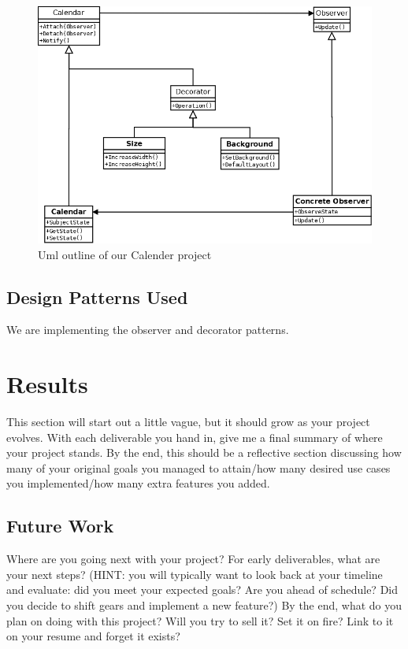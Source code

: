 \documentclass[10pt,conference,onecolumn,compsoc]{IEEEtran}
\begin{document}
\begin{figure}[ht!]
\includegraphics[scale=1]{Uml Format.png}
\caption{Uml outline of our Calender project}
\label{UML of Calender Project}
\end{figure}


\subsection{Design Patterns Used}
We are implementing the observer and decorator patterns.


\section{Results}
This section will start out a little vague, but it should grow as your project evolves.  With each deliverable you hand in, give me a final summary of where your project stands.  By the end, this should be a reflective section discussing how many of your original goals you managed to attain/how many desired use cases you implemented/how many extra features you added.

\subsection{Future Work}
Where are you going next with your project?
For early deliverables, what are your next steps?  (HINT: you will typically want to look back at your timeline and evaluate: did you meet your expected goals?  Are you ahead of schedule?  Did you decide to shift gears and implement a new feature?)
By the end, what do you plan on doing with this project?  Will you try to sell it?  Set it on fire?  Link to it on your resume and forget it exists?
\end{document}
